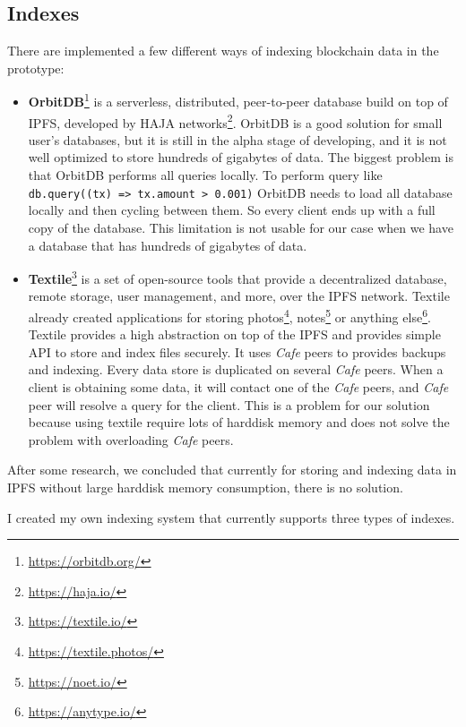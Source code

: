 \subsection{Indexes}
There are implemented a few different ways of indexing blockchain data in the prototype:
\begin{itemize}
    \item \textbf{OrbitDB}\footnote{\url{https://orbitdb.org/}} is a serverless, distributed, peer-to-peer database build on top of IPFS, developed by HAJA networks\footnote{\url{https://haja.io/}}. OrbitDB is a good solution for small user's databases, but it is still in the alpha stage of developing, and it is not well optimized to store hundreds of gigabytes of data. The biggest problem is that OrbitDB performs all queries locally. To perform query like \texttt{db.query((tx) => tx.amount > 0.001)} OrbitDB needs to load all database locally and then cycling between them. So every client ends up with a full copy of the database. This limitation is not usable for our case when we have a database that has hundreds of gigabytes of data.
    \cite{OrbitDBManual}
    \item \textbf{Textile}\footnote{\url{https://textile.io/}} is a set of open-source tools that provide a decentralized database, remote storage, user management, and more, over the IPFS network. Textile already created applications for storing photos\footnote{\url{https://textile.photos/}}, notes\footnote{\url{https://noet.io/}} or anything else\footnote{\url{https://anytype.io/}}. Textile provides a high abstraction on top of the IPFS and provides simple API to store and index files securely. It uses \textit{Cafe} peers to provides backups and indexing. Every data store is duplicated on several \textit{Cafe} peers. When a client is obtaining some data, it will contact one of the \textit{Cafe} peers, and \textit{Cafe} peer will resolve a query for the client. This is a problem for our solution because using textile require lots of harddisk memory and does not solve the problem with overloading \textit{Cafe} peers.
    \cite{TextileWhitePaper}
\end{itemize}

After some research, we concluded that currently for storing and indexing data in IPFS without large harddisk memory consumption, there is no solution.

I created my own indexing system that currently supports three types of indexes.

